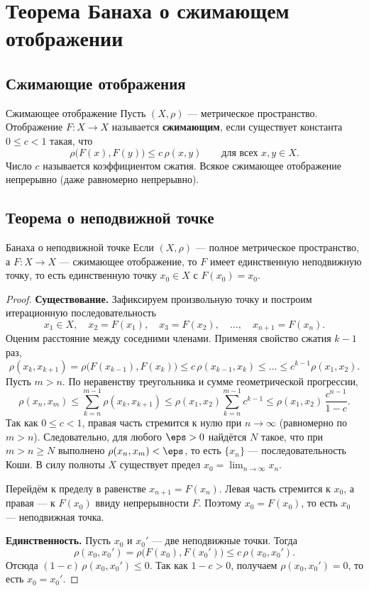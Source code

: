
\section{Теорема Банаха о сжимающем отображении}

\subsection*{Сжимающие отображения}

\begin{Definition}{Сжимающее отображение}{}
	Пусть $(X,\rho)$ --- метрическое пространство. Отображение $F\colon X\to X$
	называется \textbf{сжимающим}, если существует константа $0\le c<1$ такая, что
	\[
	\rho\bigl(F(x),F(y)\bigr)\le c\,\rho(x,y)\qquad\text{для всех } x,y\in X.
	\]
	Число $c$ называется коэффициентом сжатия. Всякое сжимающее отображение
	непрерывно (даже равномерно непрерывно).
\end{Definition}

\subsection*{Теорема о неподвижной точке}

\begin{Theorem}{Банаха о неподвижной точке}{}
	Если $(X,\rho)$ --- полное метрическое пространство, а $F\colon X\to X$ ---
	сжимающее отображение, то $F$ имеет единственную неподвижную точку, то есть
	единственную точку $x_0\in X$ с $F(x_0)=x_0$.
\end{Theorem}

\begin{proof}
	\textbf{Существование.} Зафиксируем произвольную точку и построим итерационную
	последовательность
	\[
	x_1\in X,\quad x_2=F(x_1),\quad x_3=F(x_2),\quad\dots,\quad x_{n+1}=F(x_n).
	\]
	Оценим расстояние между соседними членами. Применяя свойство сжатия $k-1$ раз,
	\[
	\rho(x_k,x_{k+1})=\rho\bigl(F(x_{k-1}),F(x_k)\bigr)\le c\,\rho(x_{k-1},x_k)
	\le\dots\le c^{k-1}\rho(x_1,x_2).
	\]
	Пусть $m>n$. По неравенству треугольника и сумме геометрической прогрессии,
	\[
	\rho(x_n,x_m)\le\sum_{k=n}^{m-1}\rho(x_k,x_{k+1})
	\le\rho(x_1,x_2)\sum_{k=n}^{m-1}c^{k-1}
	\le\rho(x_1,x_2)\,\frac{c^{n-1}}{1-c}.
	\]
	Так как $0\le c<1$, правая часть стремится к нулю при $n\to\infty$ (равномерно по
	$m>n$). Следовательно, для любого $\eps>0$ найдётся $N$ такое, что при $m>n\ge N$
	выполнено $\rho(x_n,x_m)<\eps$, то есть $\{x_n\}$ --- последовательность Коши. В
	силу полноты $X$ существует предел $x_0=\lim_{n\to\infty}x_n$.

	Перейдём к пределу в равенстве $x_{n+1}=F(x_n)$. Левая часть стремится к $x_0$, а
	правая --- к $F(x_0)$ ввиду непрерывности $F$. Поэтому $x_0=F(x_0)$, то есть $x_0$
	--- неподвижная точка.

	\textbf{Единственность.} Пусть $x_0$ и $x_0'$ --- две неподвижные точки. Тогда
	\[
	\rho(x_0,x_0')=\rho\bigl(F(x_0),F(x_0')\bigr)\le c\,\rho(x_0,x_0').
	\]
	Отсюда $(1-c)\,\rho(x_0,x_0')\le 0$. Так как $1-c>0$, получаем
	$\rho(x_0,x_0')=0$, то есть $x_0=x_0'$.
\end{proof}
